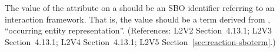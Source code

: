 The value of the  attribute on a \Reaction should
be an SBO identifier referring to an interaction framework.  That
is, the value should be a term derived from \sbointeractionID,
``occurring entity representation''.  (References: L2V2 Section~4.13.1; L2V3
Section~4.13.1; L2V4 Section~4.13.1; L2V5 Section~\ref{sec:reaction-sboterm}.)
